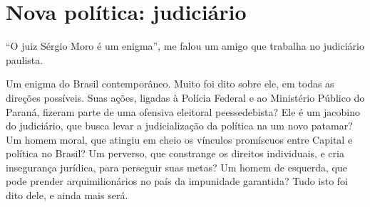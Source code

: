 \chapter{Nova política:
judiciário}\label{nova-poluxedtica-judiciuxe1rio}

``O juiz Sérgio Moro é um enigma'', me falou um amigo que trabalha no
judiciário paulista.

Um enigma do Brasil contemporâneo. Muito foi dito sobre ele, em todas as
direções possíveis. Suas ações, ligadas à Polícia Federal e ao
Ministério Público do Paraná, fizeram parte de uma ofensiva eleitoral
peessedebista? Ele é um jacobino do judiciário, que busca levar a
judicialização da política na um novo patamar? Um homem moral, que
atingiu em cheio os vínculos promíscuos entre Capital e política no
Brasil? Um perverso, que constrange os direitos individuais, e cria
insegurança jurídica, para perseguir suas metas? Um homem de esquerda,
que pode prender arquimilionários no país da impunidade garantida? Tudo
isto foi dito dele, e ainda mais será.

